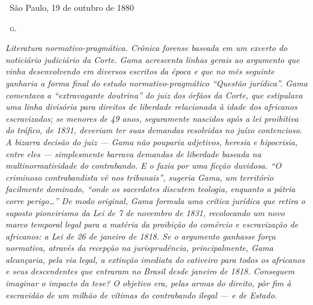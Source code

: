 \medskip

\hfill\ São Paulo, 19 de outubro de 1880

\hfill\ \textsc{g.}


\begin{resumo}
\emph{Literatura normativo-pragmática. Crônica forense baseada em um
excerto do noticiário judiciário da Corte. Gama acrescenta linhas gerais
ao argumento que vinha desenvolvendo em diversos escritos da época e que
no mês seguinte ganharia a forma final do estudo normativo-pragmático ``Questão jurídica''. Gama comentava a ``extravagante doutrina'' do
juiz dos órfãos da Corte, que estipulava uma linha divisória para
direitos de liberdade relacionada à idade dos africanos escravizados; se
menores de 49 anos, seguramente nascidos após a lei proibitiva do
tráfico, de 1831, deveriam ter suas demandas resolvidas no juízo
contencioso. A bizarra decisão do juiz --- Gama não pouparia adjetivos,
heresia e hipocrisia, entre eles --- simplesmente barrava demandas de
liberdade baseada na multinormatividade do contrabando. E o fazia por
uma ficção duvidosa. ``O criminoso contrabandista vê nos tribunais'',
sugeria Gama, um território facilmente dominado, ``onde os sacerdotes
discutem teologia, enquanto a pátria corre perigo\ldots{}'' De modo original,
Gama formula uma crítica jurídica que retira o suposto pioneirismo da
Lei de 7 de novembro de 1831, recolocando um novo marco temporal legal
para a matéria da proibição do comércio e escravização de africanos: a
Lei de 26 de janeiro de 1818. Se o argumento ganhasse força normativa,
através da recepção na jurisprudência, principalmente, Gama alcançaria,
pela via legal, a extinção imediata do cativeiro para todos os africanos
e seus descendentes que entraram no Brasil desde janeiro de 1818.
Conseguem imaginar o impacto da tese? O objetivo era, pelas armas do
direito, pôr fim à escravidão de um milhão de vítimas do contrabando
ilegal --- e de Estado. }
\end{resumo}

